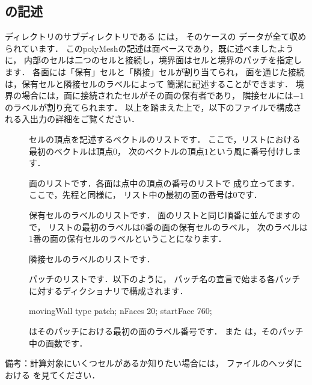 \subsection{の記述}
\label{ssec:5.1.2}
ディレクトリのサブディレクトリである
には，
そのケースの
%
%
データが全て収められています．
このpolyMeshの記述は面ベースであり，既に述べましたように，
内部のセルは二つのセルと接続し，境界面はセルと境界のパッチを指定します．
各面には「保有」セルと「隣接」セルが割り当てられ，
面を通じた接続は，保有セルと隣接セルのラベルによって
簡潔に記述することができます．
境界の場合には，面に接続されたセルがその面の保有者であり，
隣接セルには$-1$のラベルが割り充てられます．
以上を踏まえた上で，以下のファイルで構成される入出力の詳細をご覧ください．
\begin{description}
 \item[]
%
%
            セルの頂点を記述するベクトルのリストです．
            ここで，リストにおける最初のベクトルは頂点$0$，
            次のベクトルの頂点$1$という風に番号付けします．
 \item[]
%
%
            面のリストです．各面は点中の頂点の番号のリストで
            成り立ってます．ここで，先程と同様に，
            リスト中の最初の面の番号は$0$です．
 \item[]
%
%
            保有セルのラベルのリストです．
            面のリストと同じ順番に並んでますので，
            リストの最初のラベルは$0$番の面の保有セルのラベル，
            次のラベルは$1$番の面の保有セルのラベルということになります．
 \item[]
%
%
            隣接セルのラベルのリストです．
 \item[]
%
%
            パッチのリストです．以下のように，
            パッチ名の宣言で始まる各パッチに対するディクショナリで構成されます．
\begin{OFverbatim}[file]
movingWall
{
    type patch;
    nFaces 20;
    startFace 760;
}
\end{OFverbatim}
%
%
            はそのパッチにおける最初の面のラベル番号です．
            また
%
%
            は，そのパッチ中の面数です．
\end{description}
備考：計算対象にいくつセルがあるか知りたい場合には，
ファイルのヘッダにおける
を見てください．


